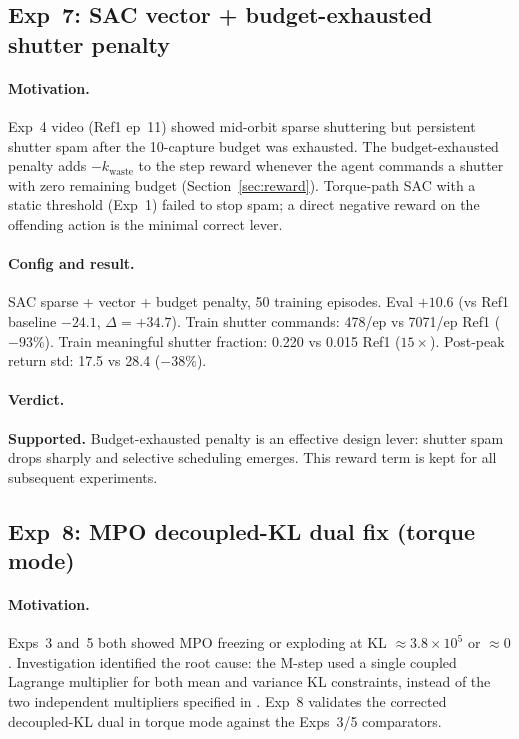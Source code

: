 \subsection{Exp~7: SAC vector + budget-exhausted shutter penalty}
\label{sec:exp7}

\paragraph{Motivation.}
Exp~4 video (Ref1 ep~11) showed mid-orbit sparse shuttering but persistent shutter spam after the
10-capture budget was exhausted.
The budget-exhausted penalty adds $-k_\text{waste}$ to the step reward whenever the agent commands a
shutter with zero remaining budget (Section~\ref{sec:reward}).
Torque-path SAC with a static threshold (Exp~1) failed to stop spam; a direct negative reward on
the offending action is the minimal correct lever.

\paragraph{Config and result.}
SAC sparse + vector + budget penalty, 50 training episodes.
Eval $+10.6$ (vs Ref1 baseline $-24.1$, $\Delta=+34.7$).
Train shutter commands: 478/ep vs 7071/ep Ref1 ($-93\%$).
Train meaningful shutter fraction: 0.220 vs 0.015 Ref1 ($15\times$).
Post-peak return std: 17.5 vs 28.4 ($-38\%$).

\paragraph{Verdict.}
\textbf{Supported.}
Budget-exhausted penalty is an effective design lever: shutter spam drops sharply and selective scheduling emerges.
This reward term is kept for all subsequent experiments.

\subsection{Exp~8: MPO decoupled-KL dual fix (torque mode)}
\label{sec:exp8}

\paragraph{Motivation.}
Exps~3 and~5 both showed MPO freezing or exploding at KL $\approx 3.8\times10^5$ or $\approx 0$.
Investigation identified the root cause: the M-step used a single coupled Lagrange multiplier
for both mean and variance KL constraints, instead of the two independent multipliers specified
in \citet{abdolmaleki2018mpo}.
Exp~8 validates the corrected decoupled-KL dual in torque mode against the Exps~3/5 comparators.

